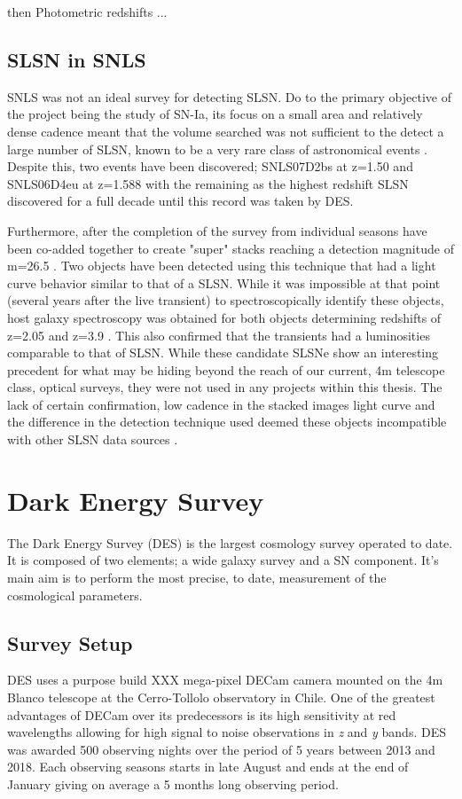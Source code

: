 then Photometric redshifts ...


\subsection{SLSN in SNLS}
SNLS was not an ideal survey for detecting SLSN. Do to the primary objective of the project being the study of SN-Ia, its focus on a small area and relatively dense cadence meant that the volume searched was not sufficient to the detect a large number of SLSN, known to be a very rare class of astronomical events \citep{Cooke2012,Prajs2016,Quimby2013}. Despite this, two events have been discovered; SNLS07D2bs at z=1.50 and SNLS06D4eu at z=1.588 with the remaining as the highest redshift SLSN discovered for a full decade until this record was taken by DES.

Furthermore, after the completion of the survey from individual seasons have been co-added together to create "super" stacks reaching a detection magnitude of m=26.5 \citep{Cooke2012}. Two objects have been detected using this technique that had a light curve behavior similar to that of a SLSN. While it was impossible at that point (several years after the live transient) to spectroscopically identify these objects, host galaxy spectroscopy was obtained for both objects determining redshifts of z=2.05 and z=3.9 \citep{Cooke2012}. This also confirmed that the transients had a luminosities comparable to that of SLSN. While these candidate SLSNe show an interesting precedent for what may be hiding beyond the reach of our current, 4m telescope class, optical surveys, they were not used in any projects within this thesis. The lack of certain confirmation, low cadence in the stacked images light curve and the difference in the detection technique used deemed these objects incompatible with other SLSN data sources \citep{Prajs2016}.

\section{Dark Energy Survey}
The Dark Energy Survey (DES) is the largest cosmology survey operated to date. It is composed of two elements; a wide galaxy survey and a SN component. It's main aim is to perform the most precise, to date, measurement of the cosmological parameters.

\subsection{Survey Setup}
DES uses a purpose build XXX mega-pixel DECam camera mounted on the 4m Blanco telescope at the Cerro-Tollolo observatory in Chile. One of the greatest advantages of DECam over its predecessors is its high sensitivity at red wavelengths allowing for high signal to noise observations in \textit{z} and \textit{y} bands. DES was awarded 500 observing nights over the period of 5 years between 2013 and 2018. Each observing seasons starts in late August and ends at the end of January giving on average a 5 months long observing period.

